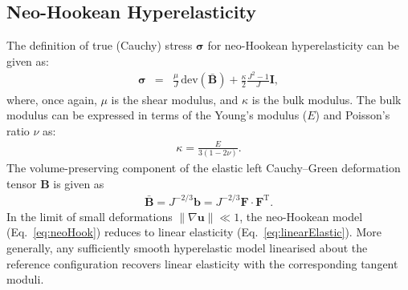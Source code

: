 \documentclass[review,3p]{elsarticle}
\newcommand{\bb}{\boldsymbol}
\begin{document}
\subsection{Neo-Hookean Hyperelasticity}
\label{app:mechLaws:NH}
%
The definition of true (Cauchy) stress $\bb{\sigma}$ for neo-Hookean hyperelasticity can be given as:
\begin{eqnarray} \label{eq:neoHook}
	\bb{\sigma}
	&=& \frac{\mu}{J} \, \text{dev} \left( \bar{\bb{B}} \right) + \frac{\kappa}{2} \frac{J^2 - 1}{J} \bb{I},
\end{eqnarray}
where, once again, $\mu$ is the shear modulus, and $\kappa$ is the bulk modulus.
The bulk modulus can be expressed in terms of the Young's modulus ($E$) and Poisson's ratio $\nu$ as:
\begin{eqnarray}
	\kappa = \frac{E}{3(1 - 2\nu)}.
\end{eqnarray}
The volume-preserving component of the elastic left Cauchy--Green deformation tensor $\boldsymbol{B}$ is given as
\begin{eqnarray}
	\bar{\bb{B}} = J^{-2/3} \bb{b} = J^{-2/3} \bb{F} \cdot \bb{F}^{\text{T}}.
\end{eqnarray}
{\color{orange}In the limit of small deformations $\lVert \nabla \mathbf{u} \rVert  \ll 1$, the neo-Hookean model (Eq.~\eqref{eq:neoHook}) reduces to linear elasticity (Eq.~\eqref{eq:linearElastic}). More generally, any sufficiently smooth hyperelastic model linearised about the reference configuration recovers linear elasticity with the corresponding tangent moduli.}
\iffalse
%
\end{document}

